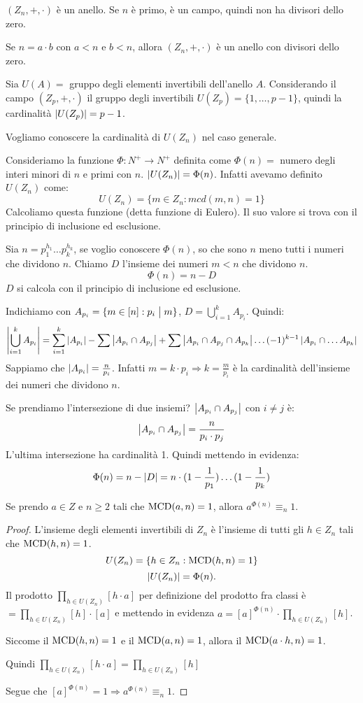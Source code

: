 $(Z_n, +, \cdot)$ \`e un anello. Se $n$ \`e primo, \`e un campo, quindi non ha divisori dello zero.

Se $n = a \cdot b$ con $a < n$ e $b < n$, allora $(Z_n, +, \cdot)$ \`e un anello con divisori dello zero.

Sia $U(A) =$ gruppo degli elementi invertibili dell'anello $A$. Considerando il campo $(Z_p, +, \cdot)$ il gruppo degli invertibili $U(Z_p) = \{1, \dots,  p-1\}$, quindi la cardinalit\`a $\left\lvert{U(Z_p)}\right\rvert = p-1$.

Vogliamo conoscere la cardinalit\`a di $U(Z_n)$ nel caso generale.

Consideriamo la funzione $\Phi : N^+ \to N^+$ definita come $\Phi (n) =$ numero degli interi minori di $n$ e primi con $n$. $\left\lvert{U(Z_n)}\right\rvert = \Phi(n)$. Infatti avevamo definito $U(Z_n)$ come:
\[
U(Z_n) = \{ m \in Z_n : mcd(m, n) = 1 \}
\]
Calcoliamo questa funzione (detta funzione di Eulero). Il suo valore si trova con il principio di inclusione ed esclusione.

Sia $n = p_{1}^{h_1} \dots p_{k}^{h_k}$, se voglio conoscere $\Phi(n)$, so che sono $n$ meno tutti i numeri che dividono $n$. Chiamo $D$ l'insieme dei numeri $m < n$ che dividono $n$.
\[
\Phi(n) = n - D
\]
$D$ si calcola con il principio di inclusione ed esclusione. 

Indichiamo con $A_{p_i} = \{ m \in [n] : p_i \bigm| m \}$, $D = \bigcup_{i = 1}^{k} A_{p_i}$. Quindi:
\[
\left\lvert{\bigcup_{i = 1}^{k} A_{p_i}}\right\rvert = \sum_{i = 1}^{k} \left\lvert{A_{p_i}}\right\rvert - \sum \left\lvert{A_{p_i} \cap A_{p_j}}\right\rvert + \sum \left\lvert{A_{p_i} \cap A_{p_j} \cap A_{p_k}}\right\rvert \dots (-1)^{k-1} \left\lvert{A_{p_i} \cap \dots A_{p_k}}\right\rvert
\]
Sappiamo che $\left\lvert{A_{p_i}}\right\rvert = \frac{n}{p_i}$. Infatti $m = k \cdot p_i \Rightarrow k = \frac{m}{p_i}$ \`e la cardinalit\`a dell'insieme dei numeri che dividono $n$.

Se prendiamo l'intersezione di due insiemi? $\left\lvert{A_{p_i} \cap A_{p_j}}\right\rvert$ con $i \neq j$ \`e:
\[
\left\lvert{A_{p_i} \cap A_{p_j}}\right\rvert = \frac{n}{p_i \cdot p_j}
\]
L'ultima intersezione ha cardinalit\`a 1. Quindi mettendo in evidenza:
\[
\Phi (n) = n - \left\lvert{D}\right\rvert = n \cdot (1 - \frac{1}{p_1}) \dots (1 - \frac{1}{p_k})
\]
\begin{theorem}
Se prendo $a \in Z$ e $n \ge 2$ tali che $\operatorname{MCD}(a, n) = 1$, allora $a^{\Phi(n)} \equiv_n 1$. 
\end{theorem}
\begin{proof}
L'insieme degli elementi invertibili di $Z_n$ \`e l'insieme di tutti gli $h \in Z_n$ tali che $\operatorname{MCD}(h, n) = 1$.
\[
U(Z_n) = \{ h \in Z_n : \operatorname{MCD}(h, n) = 1 \}
\]
\[
\left\lvert{U(Z_n)}\right\rvert = \Phi(n). 
\]
Il prodotto $\prod_{h \in U(Z_n)} [h \cdot a]$  per definizione del prodotto fra classi \`e $= \prod_{h \in U(Z_n)} [h] \cdot [a]$ e mettendo in evidenza $a = [a]^{\Phi(n)} \cdot \prod_{h \in U(Z_n)} [h]$.

Siccome il $\operatorname{MCD}(h, n) = 1$ e il $\operatorname{MCD}(a, n) = 1$, allora il $\operatorname{MCD}(a \cdot h, n) = 1$.

Quindi $\prod_{h \in U(Z_n)} [h \cdot a] = \prod_{h \in U(Z_n)} [h]$

Segue che $[a]^{\Phi(n)} = 1 \Rightarrow a^{\Phi(n)} \equiv_n 1$.
\end{proof}


